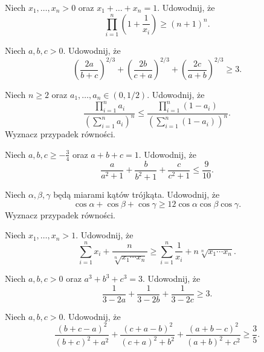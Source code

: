 \documentclass{lecture-kuznia}
\begin{document}
\begin{problem}\label{Z8}
	Niech $x_1,\dots,x_n>0$ oraz $x_1+\dots+x_n=1$. Udowodnij, że
	\[
		\prod_{i=1}^n\left(1+\frac1{x_i}\right)\geqslant(n+1)^n.
	\]
\end{problem}

\begin{problem}\label{Z9}
	Niech $a,b,c>0$. Udowodnij, że
	\[
		\left(\frac{2a}{b+c}\right)^{\!2/3}
		+\left(\frac{2b}{c+a}\right)^{\!2/3}
		+\left(\frac{2c}{a+b}\right)^{\!2/3}\geqslant3.
	\]
\end{problem}

\begin{problem}\label{ZIloczynyJensen}
	Niech $n\geqslant2$ oraz $a_1,\dots,a_n\in(0,1/2)$. Udowodnij, że
	\[
		\frac{\prod_{i=1}^n a_i}
		{\left(\sum_{i=1}^n a_i\right)^n}
		\leqslant
		\frac{\prod_{i=1}^n(1-a_i)}
		{\left(\sum_{i=1}^n(1-a_i)\right)^n}.
	\]
	Wyznacz przypadek równości.
\end{problem}

\begin{problem}\label{ZE2}
	Niech $a,b,c\geqslant-\frac34$ oraz $a+b+c=1$. Udowodnij, że
	\[
		\frac{a}{a^2+1}+\frac{b}{b^2+1}+\frac{c}{c^2+1}
		\leqslant\frac9{10}.
	\]
\end{problem}

\begin{problem}\label{ZKatyCosinusy}
	Niech $\alpha,\beta,\gamma$ będą miarami kątów trójkąta. Udowodnij, że
	\[
		\cos\alpha+\cos\beta+\cos\gamma
		\geqslant12\cos\alpha\cos\beta\cos\gamma.
	\]
	Wyznacz przypadek równości.
\end{problem}

\begin{problem}\label{Z11}
	Niech $x_1,\dots,x_n>1$. Udowodnij, że
	\[
		\sum_{i=1}^n x_i+\frac{n}{\sqrt[n]{x_1\cdots x_n}}
		\geqslant
		\sum_{i=1}^n\frac1{x_i}+n\sqrt[n]{x_1\cdots x_n}.
	\]
\end{problem}

\begin{problem}\label{Z10}
	Niech $a,b,c>0$ oraz $a^3+b^3+c^3=3$. Udowodnij, że
	\[
		\frac1{3-2a}+\frac1{3-2b}+\frac1{3-2c}\geqslant3.
	\]
\end{problem}

\begin{problem}\label{Z14}
	Niech $a,b,c>0$. Udowodnij, że
	\[
		\frac{(b+c-a)^2}{(b+c)^2+a^2}
		+\frac{(c+a-b)^2}{(c+a)^2+b^2}
		+\frac{(a+b-c)^2}{(a+b)^2+c^2}
		\geqslant\frac35.
	\]
\end{problem}
\end{document}
